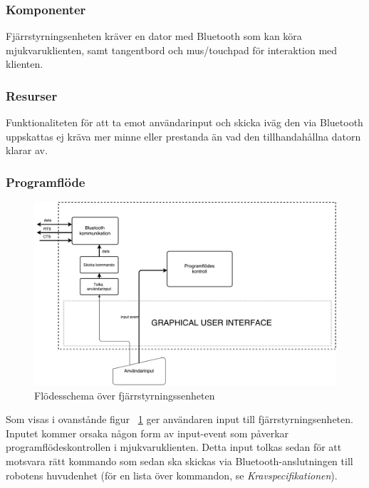 \documentclass{article}
\begin{document}
\subsubsection{Komponenter}
Fjärrstyrningsenheten kräver en dator med Bluetooth som kan köra mjukvaruklienten, samt tangentbord och mus/touchpad för interaktion med klienten. 

\subsubsection{Resurser}
Funktionaliteten för att ta emot användarinput och skicka iväg den via Bluetooth uppskattas ej kräva mer minne eller prestanda än vad den tillhandahållna datorn klarar av.

\subsubsection{Programflöde}
\begin{figure}[H]
\centering 
\includegraphics[scale=0.3]{Fjarrstyrningsenhet_flowchart3}
\caption{Flödesschema över fjärrstyrningssenheten}
\label{fig:Fjarrstyrningsenhet_flowchart3}
\end{figure}
Som visas i ovanstånde figur ~\ref{fig:Fjarrstyrningsenhet_flowchart3} ger användaren input till fjärrstyrningsenheten. Inputet kommer orsaka någon form av input-event som påverkar programflödeskontrollen i mjukvaruklienten. Detta input tolkas sedan för att motsvara rätt kommando som sedan ska skickas via Bluetooth-anslutningen till robotens huvudenhet (för en lista över kommandon, se \textit{Kravspecifikationen}).

\clearpage
\end{document}
